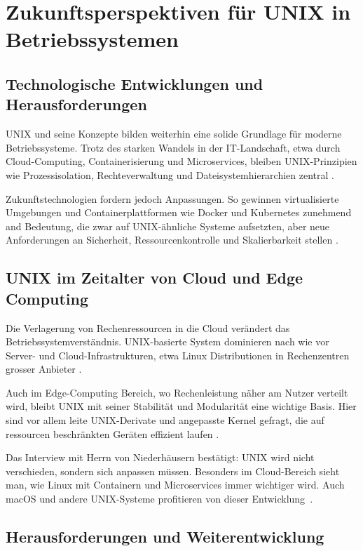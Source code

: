 \section{Zukunftsperspektiven für UNIX in Betriebssystemen}

\subsection{Technologische Entwicklungen und Herausforderungen}

UNIX und seine Konzepte bilden weiterhin eine solide Grundlage für moderne Betriebssysteme. Trotz des starken Wandels in der IT-Landschaft, etwa durch
Cloud-Computing, Containerisierung und Microservices, bleiben UNIX-Prinzipien wie Prozessisolation, Rechteverwaltung und Dateisystemhierarchien zentral
\cite{ArtOfUnixProgramming, ModernOS}.

Zukunftstechnologien fordern jedoch Anpassungen. So gewinnen virtualisierte Umgebungen und Containerplattformen wie Docker und Kubernetes zunehmend and Bedeutung,
die zwar auf UNIX-ähnliche Systeme aufsetzten, aber neue Anforderungen an Sicherheit, Ressourcenkontrolle und Skalierbarkeit stellen \cite{OSConcept}.


\subsection{UNIX im Zeitalter von Cloud und Edge Computing}

Die Verlagerung von Rechenressourcen in die Cloud verändert das Betriebssystemverständnis. UNIX-basierte System dominieren nach wie vor Server- und
Cloud-Infrastrukturen, etwa Linux Distributionen in Rechenzentren grosser Anbieter \cite{ModernOS, OSConcept}.

Auch im Edge-Computing Bereich, wo Rechenleistung näher am Nutzer verteilt wird, bleibt UNIX mit seiner Stabilität und Modularität eine wichtige Basis.
Hier sind vor allem leite UNIX-Derivate und angepasste Kernel gefragt, die auf ressourcen beschränkten Geräten effizient laufen \cite{interviewNH}.

Das Interview mit Herrn von Niederhäusern bestätigt: \glqq UNIX wird nicht verschieden, sondern sich anpassen müssen. Besonders im Cloud-Bereich sieht man, wie
Linux mit Containern und Microservices immer wichtiger wird. Auch macOS und andere UNIX-Systeme profitieren von dieser Entwicklung\grqq \ \cite{interviewNH}.


\subsection{Herausforderungen und Weiterentwicklung}

